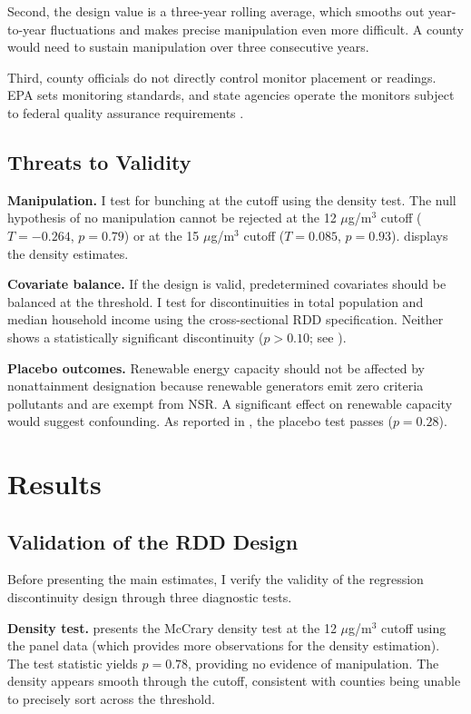 \documentclass[12pt]{article}
\begin{document}
Second, the design value is a three-year rolling average, which smooths out year-to-year fluctuations and makes precise manipulation even more difficult. A county would need to sustain manipulation over three consecutive years.

Third, county officials do not directly control monitor placement or readings. EPA sets monitoring standards, and state agencies operate the monitors subject to federal quality assurance requirements \citep{grainger2018discrimination}.

\subsection{Threats to Validity}

\textbf{Manipulation.} I test for bunching at the cutoff using the \citet{cattaneo2020simple} density test. The null hypothesis of no manipulation cannot be rejected at the 12 $\mu$g/m$^3$ cutoff ($T = -0.264$, $p = 0.79$) or at the 15 $\mu$g/m$^3$ cutoff ($T = 0.085$, $p = 0.93$).  displays the density estimates.

\textbf{Covariate balance.} If the design is valid, predetermined covariates should be balanced at the threshold. I test for discontinuities in total population and median household income using the cross-sectional RDD specification. Neither shows a statistically significant discontinuity ($p > 0.10$; see ).

\textbf{Placebo outcomes.} Renewable energy capacity should not be affected by nonattainment designation because renewable generators emit zero criteria pollutants and are exempt from NSR. A significant effect on renewable capacity would suggest confounding. As reported in , the placebo test passes ($p = 0.28$).


\section{Results}
\label{sec:results}

\subsection{Validation of the RDD Design}

Before presenting the main estimates, I verify the validity of the regression discontinuity design through three diagnostic tests.

\textbf{Density test.}  presents the McCrary density test at the 12 $\mu$g/m$^3$ cutoff using the panel data (which provides more observations for the density estimation). The test statistic yields $p = 0.78$, providing no evidence of manipulation. The density appears smooth through the cutoff, consistent with counties being unable to precisely sort across the threshold.
\end{document}
